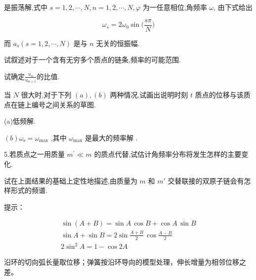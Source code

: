 \documentclass[UTF8,fontset=fandol,a4paper,11pt]{ctexart}
\newcommand{\figcaption}[1]{\par\vspace{2pt}{\small\color{muted}#1}\par}
\begin{document}
是振荡解,式中 \(s=1,2,\cdots,N,n=1,2,\cdots,N,\varphi\)
为一任意相位,角频率 \(\omega\), 由下式给出

\[
\omega_{ s } = 2 \omega_{ 0 } \sin \bigg ( \frac{ s \pi } { N } \bigg )
\]

而 \(a_{s}(s=1,2,\cdots,N)\) 是与 \(n\) 无关的恒振幅.

试叙述对于一个含有无穷多个质点的链条,频率的可能范围.

试确定\(\frac{u_{n}}{u_{n+1}}\)的比值.

当 \(N\) 很大时,对于下列 \((a),(b)\) 两种情况,试画出说明时刻 \(t\)
质点的位移与该质点在链上编号之间关系的草图.

(a)低频解.

\((b)\omega_{\mathrm{s}}=\omega_{\mathrm{max}}\) ,其中
\(\omega_{\mathrm{max}}\) 是最大的频率解 .

5.若质点之一用质量 \(m^{\prime} \ll m\)
的质点代替,试估计角频率分布将发生怎样的主要变化.

试在上面结果的基础上定性地描述,由质量为 \(m\) 和 \(m'\)
交替联接的双原子链会有怎样形式的频谱.

提示：

\[
\begin{array}{r} { \sin ( A + B ) = \sin A \, \cos B + \cos A \, \sin B } \\{ \sin A + \sin B = 2 \sin \frac{ A + B } { 2 } \, \cos \frac{ A - B } { 2 } } \\{ 2 \sin^{2} A = 1 - \cos 2 A } \end{array}
\]

沿环的切向弧长量取位移；弹簧按沿环导向的模型处理，伸长增量为相邻位移之差。

\begin{center}\begin{minipage}{\linewidth}\centering{}\figcaption{图 7.28}\end{minipage}\end{center}
\end{document}
